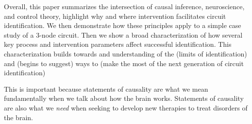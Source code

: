 Overall, this paper summarizes the intersection of causal inference, neuroscience, and control theory, highlight why and where intervention facilitates circuit identification. We then demonstrate how these principles apply to a simple case study of a 3-node circuit. Then we show a broad characterization of how several key process and intervention parameters affect successful identification. This characterization builds towards and understanding of the (limits of identification) and (begins to suggest) ways to (make the most of the next generation of circuit identification)

This is important because statements of causality are what we mean fundamentally when we talk about how the brain works. Statements of causality are also what we \textit{need} when seeking to develop new therapies to treat disorders of the brain.

